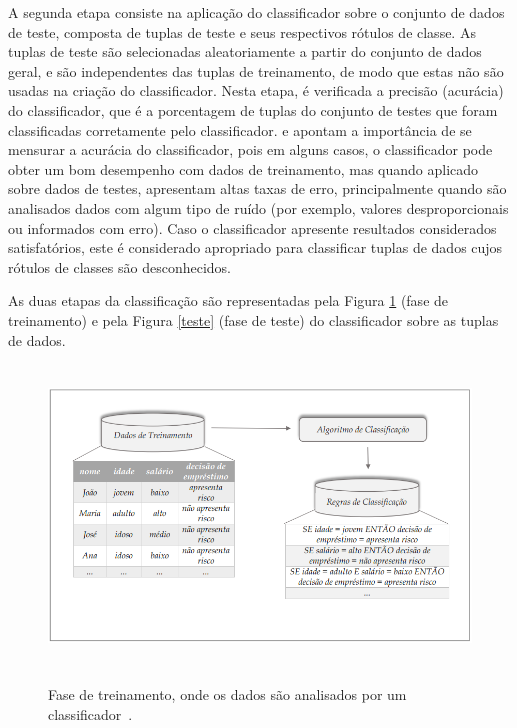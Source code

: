 A segunda etapa consiste na aplicação do classificador sobre o conjunto de dados de teste, composta de tuplas de teste e seus respectivos rótulos de classe. As tuplas de teste são selecionadas aleatoriamente a partir do conjunto de dados geral, e são independentes das tuplas de treinamento, de modo que estas não são usadas na criação do classificador. Nesta etapa, é verificada a precisão (acurácia) do classificador, que é a porcentagem de tuplas do conjunto de testes que foram classificadas corretamente pelo classificador. \citet{han_kamber2006} e  \citet{witten2005} apontam a importância de se mensurar a acurácia do classificador, pois em alguns casos, o classificador pode obter um bom desempenho com dados de treinamento, mas quando aplicado sobre dados de testes, apresentam altas taxas de erro, principalmente quando são analisados dados com algum tipo de ruído (por exemplo, valores desproporcionais ou informados com erro). Caso o classificador apresente resultados considerados satisfatórios, este é considerado apropriado para classificar tuplas de dados cujos rótulos de classes são desconhecidos. 

As duas etapas da classificação são representadas pela Figura \ref{treinamento} (fase de treinamento) e pela Figura \ref{teste} (fase de teste) do classificador sobre as tuplas de dados. 

\begin{figure}[!htb]
	\centering
	{\includegraphics[width=15cm, height=8cm]{images/classificacao1}}
	\caption {Fase de treinamento, onde os dados são analisados por um classificador~\citep{han_kamber2006}.}
	\label{treinamento}
\end{figure}

